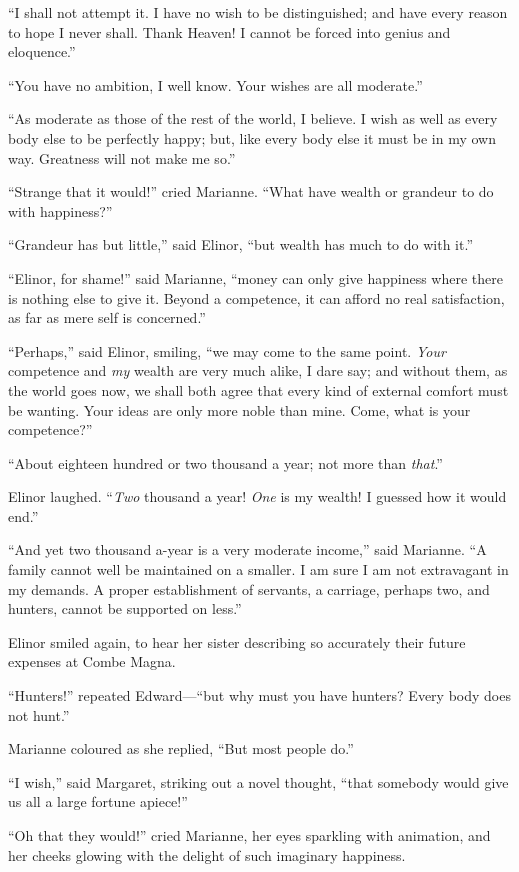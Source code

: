 ``I shall not attempt it.  I have no wish to be
distinguished; and have every reason to hope I never shall.
Thank Heaven! I cannot be forced into genius and eloquence.''

``You have no ambition, I well know.  Your wishes
are all moderate.''

``As moderate as those of the rest of the world,
I believe.  I wish as well as every body else to be
perfectly happy; but, like every body else it must be
in my own way.  Greatness will not make me so.''

``Strange that it would!'' cried Marianne.  ``What have
wealth or grandeur to do with happiness?''

``Grandeur has but little,'' said Elinor, ``but wealth
has much to do with it.''

``Elinor, for shame!'' said Marianne, ``money can only
give happiness where there is nothing else to give it.
Beyond a competence, it can afford no real satisfaction,
as far as mere self is concerned.''

``Perhaps,'' said Elinor, smiling, ``we may come
to the same point.  \emph{Your} competence and \emph{my} wealth
are very much alike, I dare say; and without them,
as the world goes now, we shall both agree that every
kind of external comfort must be wanting.  Your ideas
are only more noble than mine.  Come, what is your competence?''

``About eighteen hundred or two thousand a year;
not more than \emph{that}.''

Elinor laughed.  ``\emph{Two} thousand a year! \emph{One} is my
wealth! I guessed how it would end.''

``And yet two thousand a-year is a very moderate income,''
said Marianne.  ``A family cannot well be maintained on
a smaller.  I am sure I am not extravagant in my demands.
A proper establishment of servants, a carriage, perhaps two,
and hunters, cannot be supported on less.''

Elinor smiled again, to hear her sister describing
so accurately their future expenses at Combe Magna.

``Hunters!'' repeated Edward---``but why must you have
hunters?  Every body does not hunt.''

Marianne coloured as she replied, ``But most people do.''

``I wish,'' said Margaret, striking out a novel thought,
``that somebody would give us all a large fortune apiece!''

``Oh that they would!'' cried Marianne, her eyes
sparkling with animation, and her cheeks glowing
with the delight of such imaginary happiness.

